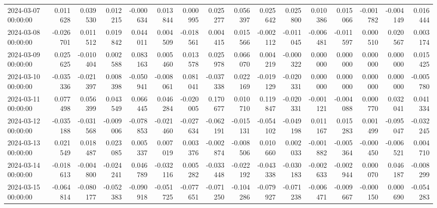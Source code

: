 \begin{tabular}{lrrrrrrrrrrrrrrr}
2024-03-07 00:00:00 & 0.011628 & 0.039530 & 0.012215 & -0.000634 & 0.013844 & 0.000995 & 0.025277 & 0.056397 & 0.025642 & 0.025800 & 0.010386 & 0.015066 & -0.001782 & -0.004149 & 0.016444 \\
2024-03-08 00:00:00 & -0.026701 & 0.011512 & 0.019842 & 0.044011 & 0.004509 & -0.018561 & 0.004415 & 0.015566 & -0.002112 & -0.011045 & -0.006481 & -0.011597 & 0.000510 & 0.020567 & 0.003174 \\
2024-03-09 00:00:00 & 0.025625 & -0.010404 & 0.002588 & 0.083163 & 0.005460 & 0.013578 & 0.025978 & 0.066070 & 0.004219 & -0.000322 & 0.000000 & 0.000000 & 0.000000 & 0.000000 & 0.015425 \\
2024-03-10 00:00:00 & -0.035336 & -0.021397 & 0.008398 & -0.050941 & -0.008061 & 0.081041 & -0.037338 & 0.022169 & -0.019129 & -0.020331 & 0.000000 & 0.000000 & 0.000000 & 0.000000 & -0.005780 \\
2024-03-11 00:00:00 & 0.077498 & 0.056399 & 0.043549 & 0.066445 & 0.046284 & -0.020005 & 0.170677 & 0.010710 & 0.119847 & -0.020331 & -0.001121 & -0.004088 & 0.000770 & 0.032041 & 0.041334 \\
2024-03-12 00:00:00 & -0.035188 & -0.031568 & -0.009006 & -0.078853 & -0.021460 & -0.027634 & -0.062191 & -0.015131 & -0.054102 & -0.049198 & 0.011167 & 0.015283 & 0.001499 & -0.095047 & -0.032245 \\
2024-03-13 00:00:00 & 0.021549 & 0.018487 & 0.023085 & 0.005337 & 0.007019 & 0.003376 & -0.002874 & -0.008506 & 0.010660 & 0.002033 & -0.001882 & -0.005364 & -0.000450 & -0.006521 & 0.004710 \\
2024-03-14 00:00:00 & -0.018613 & -0.004800 & -0.024241 & 0.046789 & -0.032116 & 0.005282 & -0.033448 & -0.022192 & -0.043338 & -0.030183 & -0.002633 & -0.002944 & 0.000070 & 0.046187 & -0.008299 \\
2024-03-15 00:00:00 & -0.064814 & -0.080177 & -0.052383 & -0.090918 & -0.051725 & -0.077651 & -0.071250 & -0.104286 & -0.079927 & -0.071238 & -0.006471 & -0.009667 & -0.000150 & 0.000690 & -0.054283 \\
\bottomrule
\end{tabular}
